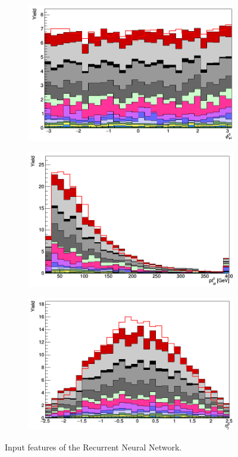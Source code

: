 \begin{figure}[H]
\begin{subfigure}{.5\textwidth}
  \centering
  \includegraphics[width=.99\linewidth]{figs/featuresRNN/el_phi_0}
\end{subfigure}%
\begin{subfigure}{.5\textwidth}
  \centering
  \includegraphics[width=.99\linewidth]{figs/featuresRNN/el_pt_0}
\end{subfigure}
\begin{subfigure}{.5\textwidth}
  \centering
  \includegraphics[width=.99\linewidth]{figs/featuresRNN/jet_eta_0}
\end{subfigure}
\caption{Input features of the Recurrent Neural Network.}
\end{figure}


